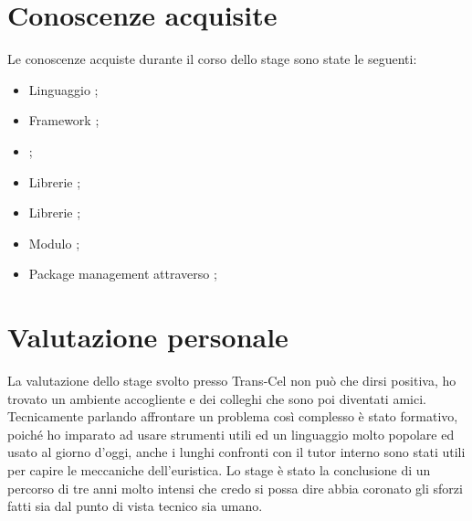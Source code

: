 \section{Conoscenze acquisite}
Le conoscenze acquiste durante il corso dello stage sono state le seguenti:
\begin{itemize}
	\item Linguaggio ;
	\item Framework ;
	\item {};
	\item Librerie ;
	\item Librerie ;
	\item Modulo ;
	\item Package management attraverso ;
\end{itemize}

\section{Valutazione personale}
La valutazione dello stage svolto presso Trans-Cel non può che dirsi positiva, ho trovato un ambiente accogliente e dei colleghi che sono poi diventati amici. Tecnicamente parlando affrontare un problema così complesso è stato formativo, poiché ho imparato ad usare strumenti utili ed un linguaggio molto popolare ed usato al giorno d'oggi, anche i lunghi confronti con il tutor interno sono stati utili per capire le meccaniche dell'euristica. Lo stage è stato la conclusione di un percorso di tre anni molto intensi che credo si possa dire abbia coronato gli sforzi fatti sia dal punto di vista tecnico sia umano.